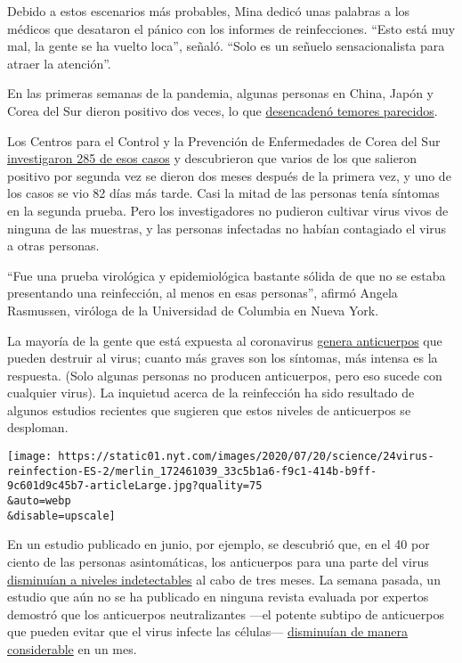 Debido a estos escenarios más probables, Mina dedicó unas palabras a los
médicos que desataron el pánico con los informes de reinfecciones.
``Esto está muy mal, la gente se ha vuelto loca'', señaló. ``Solo es un
señuelo sensacionalista para atraer la atención''.

En las primeras semanas de la pandemia, algunas personas en China, Japón
y Corea del Sur dieron positivo dos veces, lo que
\href{https://www.nytimes.com/2020/02/29/health/coronavirus-reinfection.html}{desencadenó
temores parecidos}.

Los Centros para el Control y la Prevención de Enfermedades de Corea del
Sur
\href{https://www.cdc.go.kr/board/board.es?mid=a30402000000\&bid=0030}{investigaron
285 de esos casos} y descubrieron que varios de los que salieron
positivo por segunda vez se dieron dos meses después de la primera vez,
y uno de los casos se vio 82 días más tarde. Casi la mitad de las
personas tenía síntomas en la segunda prueba. Pero los investigadores no
pudieron cultivar virus vivos de ninguna de las muestras, y las personas
infectadas no habían contagiado el virus a otras personas.

``Fue una prueba virológica y epidemiológica bastante sólida de que no
se estaba presentando una reinfección, al menos en esas personas'',
afirmó Angela Rasmussen, viróloga de la Universidad de Columbia en Nueva
York.

La mayoría de la gente que está expuesta al coronavirus
\href{https://www.nytimes.com/2020/05/07/health/coronavirus-antibody-prevalence.html}{genera
anticuerpos} que pueden destruir al virus; cuanto más graves son los
síntomas, más intensa es la respuesta. (Solo algunas personas no
producen anticuerpos, pero eso sucede con cualquier virus). La inquietud
acerca de la reinfección ha sido resultado de algunos estudios recientes
que sugieren que estos niveles de anticuerpos se desploman.

\texttt{[image: https://static01.nyt.com/images/2020/07/20/science/24virus-reinfection-ES-2/merlin\_172461039\_33c5b1a6-f9c1-414b-b9ff-9c601d9c45b7-articleLarge.jpg?quality=75\\\&auto=webp\\\&disable=upscale]}

En un estudio publicado en junio, por ejemplo, se descubrió que, en el
40 por ciento de las personas asintomáticas, los anticuerpos para una
parte del virus
\href{https://www.nytimes.com/2020/06/18/health/coronavirus-antibodies.html}{disminuían
a niveles indetectables} al cabo de tres meses. La semana pasada, un
estudio que aún no se ha publicado en ninguna revista evaluada por
expertos demostró que los anticuerpos neutralizantes ---el potente
subtipo de anticuerpos que pueden evitar que el virus infecte las
células---
\href{https://www.medrxiv.org/content/10.1101/2020.07.09.20148429v1}{disminuían
de manera considerable} en un mes.

